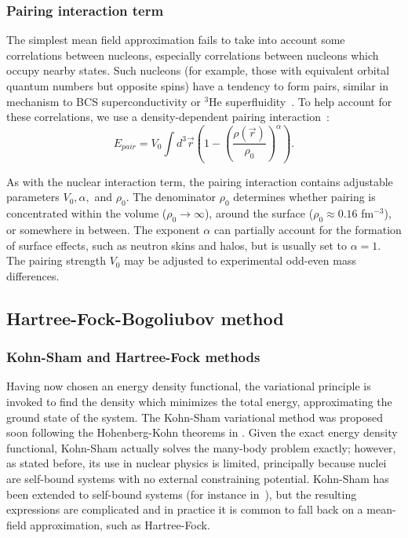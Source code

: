 \subsubsection{Pairing interaction term}
The simplest mean field approximation fails to take into account some correlations between nucleons, especially correlations between nucleons which occupy nearby states. Such nucleons (for example, those with equivalent orbital quantum numbers but opposite spins) have a tendency to form pairs, similar in mechanism to BCS superconductivity or $^3$He superfluidity~\cite{brink2005}. To help account for these correlations, we use a density-dependent pairing interaction~\cite{chasman1976}:
\begin{equation}
E_{pair} = V_0 \int d^3\vec{r} \left( 1-\left(\frac{\rho(\vec{r})}{\rho_0}\right)^\alpha \right).
\end{equation}

\noindent As with the nuclear interaction term, the pairing interaction contains adjustable parameters $V_0, \alpha,$ and $\rho_0$. The denominator $\rho_0$ determines whether pairing is concentrated within the volume ($\rho_0\rightarrow\infty$), around the surface ($\rho_0\approx0.16$ fm$^{-3}$), or somewhere in between. The exponent $\alpha$ can partially account for the formation of surface effects, such as neutron skins and halos, but is usually set to $\alpha=1$. The pairing strength $V_0$ may be adjusted to experimental odd-even mass differences.

\subsection{Hartree-Fock-Bogoliubov method}\label{sect:HFB}
\subsubsection{Kohn-Sham and Hartree-Fock methods}

Having now chosen an energy density functional, the variational principle is invoked to find the density which minimizes the total energy, approximating the ground state of the system. The Kohn-Sham variational method was proposed soon following the Hohenberg-Kohn theorems in \cite{Kohn1965}. Given the exact energy density functional, Kohn-Sham actually solves the many-body problem exactly; however, as stated before, its use in nuclear physics is limited, principally because nuclei are self-bound systems with no external constraining potential. Kohn-Sham has been extended to self-bound systems (for instance in~\cite{engel2007,barnea2007,messud2009}), but the resulting expressions are complicated and in practice it is common to fall back on a mean-field approximation, such as Hartree-Fock.

